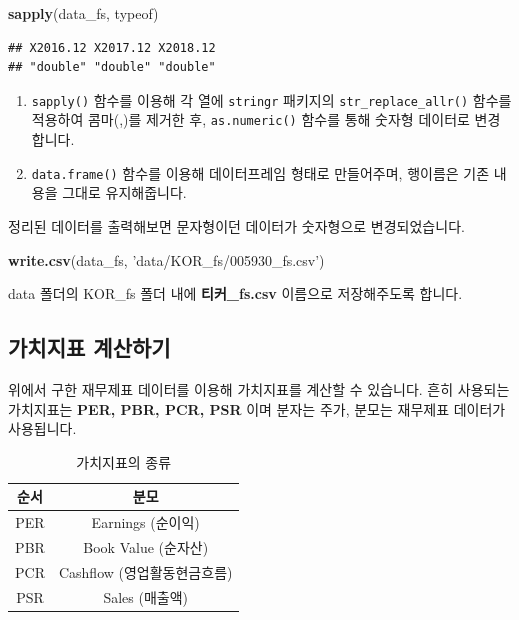 \documentclass[12pt,]{book}
\newenvironment{Shaded}{\begin{snugshade}}{\end{snugshade}}
\newcommand{\KeywordTok}[1]{\textcolor[rgb]{0.13,0.29,0.53}{\textbf{#1}}}
\newcommand{\NormalTok}[1]{#1}
\newcommand{\StringTok}[1]{\textcolor[rgb]{0.31,0.60,0.02}{#1}}
\providecommand{\tightlist}{%
  \setlength{\itemsep}{0pt}\setlength{\parskip}{0pt}}
\begin{document}
\begin{Shaded}
\begin{Highlighting}[]
\KeywordTok{sapply}\NormalTok{(data_fs, typeof)}
\end{Highlighting}
\end{Shaded}

\begin{verbatim}
## X2016.12 X2017.12 X2018.12 
## "double" "double" "double"
\end{verbatim}

\begin{enumerate}
\def\labelenumi{\arabic{enumi}.}
\tightlist
\item
  \texttt{sapply()} 함수를 이용해 각 열에 \texttt{stringr} 패키지의 \texttt{str\_replace\_allr()} 함수를 적용하여 콤마(,)를 제거한 후, \texttt{as.numeric()} 함수를 통해 숫자형 데이터로 변경합니다.
\item
  \texttt{data.frame()} 함수를 이용해 데이터프레임 형태로 만들어주며, 행이름은 기존 내용을 그대로 유지해줍니다.
\end{enumerate}

정리된 데이터를 출력해보면 문자형이던 데이터가 숫자형으로 변경되었습니다.

\begin{Shaded}
\begin{Highlighting}[]
\KeywordTok{write.csv}\NormalTok{(data_fs, }\StringTok{'data/KOR_fs/005930_fs.csv'}\NormalTok{)}
\end{Highlighting}
\end{Shaded}

data 폴더의 KOR\_fs 폴더 내에 \textbf{티커\_fs.csv} 이름으로 저장해주도록 합니다.

\hypertarget{section-29}{%
\subsection{가치지표 계산하기}\label{section-29}}

위에서 구한 재무제표 데이터를 이용해 가치지표를 계산할 수 있습니다. 흔히 사용되는 가치지표는 \textbf{PER, PBR, PCR, PSR} 이며 분자는 주가, 분모는 재무제표 데이터가 사용됩니다.

\begin{table}[!h]

\caption{\label{tab:unnamed-chunk-18}가치지표의 종류}
\centering
\begin{tabular}{cc}
\toprule
순서 & 분모\\
\midrule
\rowcolor{gray!6}  PER & Earnings (순이익)\\
PBR & Book Value (순자산)\\
\rowcolor{gray!6}  PCR & Cashflow (영업활동현금흐름)\\
PSR & Sales (매출액)\\
\bottomrule
\end{tabular}
\end{table}
\end{document}
